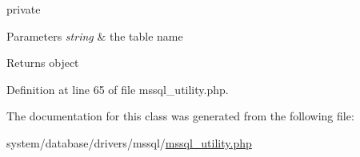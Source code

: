 private 
\begin{DoxyParams}{Parameters}
{\em string} & the table name \\
\hline
\end{DoxyParams}
\begin{DoxyReturn}{Returns}
object 
\end{DoxyReturn}


Definition at line 65 of file mssql\-\_\-utility.\-php.



The documentation for this class was generated from the following file\-:\begin{DoxyCompactItemize}
\item 
system/database/drivers/mssql/\hyperlink{mssql__utility_8php}{mssql\-\_\-utility.\-php}\end{DoxyCompactItemize}
